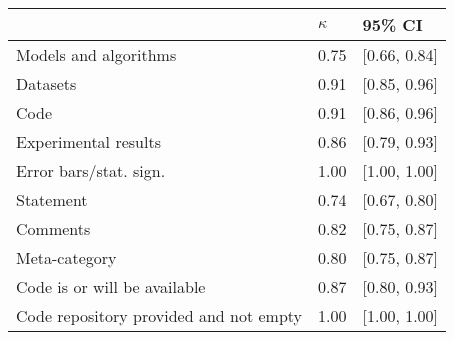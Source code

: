\begin{tabular}{lll}
\hline
& $\kappa$ & 95\% CI\\
\hline
Models and algorithms & 0.75 & [0.66, 0.84]  \\
Datasets & 0.91 & [0.85, 0.96]  \\
Code & 0.91 & [0.86, 0.96]  \\
Experimental results & 0.86 & [0.79, 0.93]  \\
Error bars/stat. sign.& 1.00 & [1.00, 1.00]  \\
Statement & 0.74 & [0.67, 0.80]  \\
Comments & 0.82  & [0.75, 0.87]  \\
Meta-category & 0.80  & [0.75, 0.87]  \\
Code is or will be available & 0.87 & [0.80, 0.93]  \\
Code repository provided and not empty & 1.00 & [1.00, 1.00]  \\
\hline
\end{tabular}

